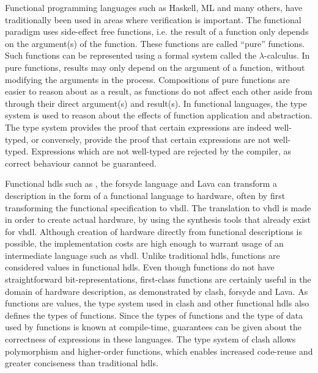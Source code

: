 Functional programming languages such as Haskell\cite{jones2003haskell}, ML\cite{milner1978theory} and many others, have traditionally been used in areas where verification is important.
The functional paradigm uses side-effect free functions, i.e. the result of a function only depends on the argument(s) of the function.
These functions are called ``pure'' functions. 
Such functions can be represented using a formal system called the $\lambda$-calculus.
In pure functions, results may only depend on the argument of a function, without modifying the arguments in the process. 
Compositions of pure functions are easier to reason about as a result, as functions do not affect each other aside from through their direct argument(s) and result(s).
In functional languages, the type system is used to reason about the effects of function application and abstraction.
The type system provides the proof that certain expressions are indeed well-typed, or conversely, provide the proof that certain expressions are not well-typed.
Expressions which are not well-typed are rejected by the compiler, as correct behaviour cannot be guaranteed.

Functional \glspl{hdl} such as \cite{clashchris,kooijman2009haskell}, the \gls{forsyde}\cite{sander2004system} language and Lava\cite{bjesse1998lava} can transform a description in the form of a functional language to hardware, often by first transforming the functional specification to \gls{vhdl}.
The translation to \gls{vhdl} is made in order to create actual hardware, by using the synthesis tools that already exist for \gls{vhdl}.
Although creation of hardware directly from functional descriptions is possible, the implementation costs are high enough to warrant usage of an intermediate language such as \gls{vhdl}.
Unlike traditional \glspl{hdl}, functions are considered values in functional \glspl{hdl}.
Even though functions do not have straightforward bit-representations, first-class functions are certainly useful in the domain of hardware description, as demonstrated by \gls{clash}, \gls{forsyde} and Lava.
As functions are values, the type system used in \gls{clash} and other functional \glspl{hdl} also defines the types of functions.
Since the types of functions and the type of data used by functions is known at compile-time, guarantees can be given about the correctness of expressions in these languages.
The type system of \gls{clash} allows polymorphism and higher-order functions, which enables increased code-reuse and greater conciseness than traditional \glspl{hdl}.

